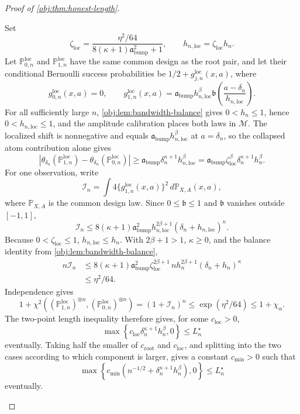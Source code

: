 \begin{proof}[Proof of \cref{obj:thm:honest-length}]
\begin{enumerate}
Set
\[
\zeta_{\mathrm{loc}}
=
\frac{\eta^2/64}{8(\kappa+1)\mathfrak a_{\mathrm{bump}}^2+1},
\qquad
h_{n,\mathrm{loc}}=\zeta_{\mathrm{loc}}h_n .
\]
Let \(\mathbb P^{\mathrm{loc}}_{0,n}\) and \(\mathbb P^{\mathrm{loc}}_{1,n}\) have the same common design as the root pair, and let their conditional Bernoulli success probabilities be \(1/2+g^{\mathrm{loc}}_{j,n}(x,a)\), where
\[
g^{\mathrm{loc}}_{0,n}(x,a)=0,\qquad
g^{\mathrm{loc}}_{1,n}(x,a)
=\mathfrak a_{\mathrm{bump}}h_{n,\mathrm{loc}}^\beta
\mathfrak b\!\left(\frac{a-\delta_n}{h_{n,\mathrm{loc}}}\right).
\]
For all sufficiently large \(n\), \cref{obj:lem:bandwidth-balance} gives \(0<h_n\le1\), hence \(0<h_{n,\mathrm{loc}}\le1\), and the amplitude calibration places both laws in \(\mathcal M\). The localized shift is nonnegative and equals \(\mathfrak a_{\mathrm{bump}}h_{n,\mathrm{loc}}^\beta\) at \(a=\delta_n\), so the collapsed atom contribution alone gives
\[
\left|
\theta_{\delta_n}(\mathbb P^{\mathrm{loc}}_{1,n})
-\theta_{\delta_n}(\mathbb P^{\mathrm{loc}}_{0,n})
\right|
\geq
\mathfrak a_{\mathrm{bump}}\delta_n^{\kappa+1}h_{n,\mathrm{loc}}^\beta
=
\mathfrak a_{\mathrm{bump}}\zeta_{\mathrm{loc}}^\beta
\delta_n^{\kappa+1}h_n^\beta .
\]
For one observation, write
\[
\mathcal I_n
=
\int 4\{g^{\mathrm{loc}}_{1,n}(x,a)\}^2\,d\mathbb P_{X,A}(x,a),
\]
where \(\mathbb P_{X,A}\) is the common design law. Since \(0\leq\mathfrak b\leq1\) and \(\mathfrak b\) vanishes outside \([-1,1]\),
\[
\mathcal I_n
\le
8(\kappa+1)\mathfrak a_{\mathrm{bump}}^2
h_{n,\mathrm{loc}}^{2\beta+1}(\delta_n+h_{n,\mathrm{loc}})^\kappa .
\]
Because \(0<\zeta_{\mathrm{loc}}\leq1\), \(h_{n,\mathrm{loc}}\leq h_n\). With \(2\beta+1>1\), \(\kappa\geq0\), and the balance identity from \cref{obj:lem:bandwidth-balance},
\[
\begin{aligned}
n\mathcal I_n
&\le
8(\kappa+1)\mathfrak a_{\mathrm{bump}}^2
\zeta_{\mathrm{loc}}^{2\beta+1}
\,n h_n^{2\beta+1}(\delta_n+h_n)^\kappa \\
&\le
\eta^2/64 .
\end{aligned}
\]
Independence gives
\[
1+\chi^2\!\left((\mathbb P^{\mathrm{loc}}_{1,n})^{\otimes n},
(\mathbb P^{\mathrm{loc}}_{0,n})^{\otimes n}\right)
=(1+\mathcal I_n)^n
\le \exp(\eta^2/64)
\le 1+\chi_\alpha .
\]
The two-point length inequality therefore gives, for some \(c_{\mathrm{loc}}>0\),
\[
\max\!\left\{c_{\mathrm{loc}}\delta_n^{\kappa+1}h_n^\beta,0\right\}
\le L_n^\star
\]
eventually. Taking half the smaller of \(c_{\mathrm{root}}\) and \(c_{\mathrm{loc}}\), and splitting into
the two cases according to which component is larger, gives a constant \(c_{\mathrm{min}}>0\) such that
\[
\max\!\left\{c_{\mathrm{min}}\left(n^{-1/2}+\delta_n^{\kappa+1}h_n^\beta\right),0\right\}
\le L_n^\star
\]
eventually.


\end{enumerate}
\end{proof}
